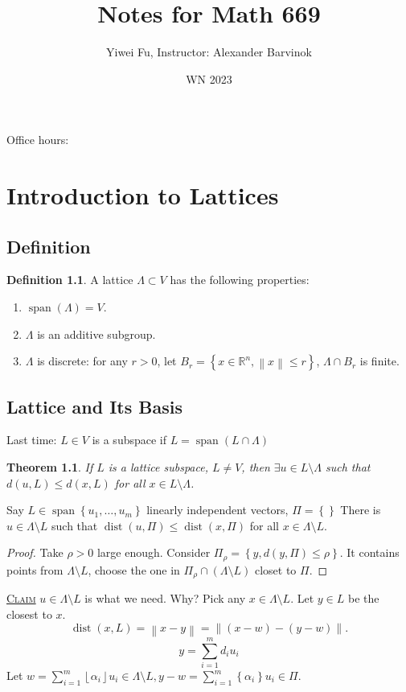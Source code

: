 \documentclass{report}
\newcommand{\R}{\mathbb{R}}
\def \dist {\operatorname{dist}}
\def \dist {\operatorname{dist}}
\newcommand{\norm}[1]{\left\| #1 \right\|}
\newcommand{\floor}[1]{\left\lfloor #1 \right\rfloor}
\newcommand{\set}[1]{\left\{ #1 \right\}}
\newcommand{\fancyem}[1]{\underline{\textsc{#1}}}
\newtheorem{theorem}{Theorem}[section]
\theoremstyle{definition}
\newtheorem{definition}{Definition}[section]
\theoremstyle{remark}
\numberwithin{equation}{section}
\begin{document}
\title{Notes for Math 669}
\author{Yiwei Fu, Instructor: Alexander Barvinok}
\date{WN 2023}
\maketitle


\tableofcontents
Office hours: 

\clearpage
{}


\chapter{Introduction to Lattices}
\section{Definition}
\begin{definition}
    A lattice $\Lambda \subset V$ has the following properties:
    \begin{enumerate}
        \item $\operatorname{span}(\Lambda) = V$.
        \item $\Lambda$ is an additive subgroup.
        \item $\Lambda$ is discrete: for any $r > 0$, let $B_r = \set{x \in \R^n, \norm{x} \leq r}$, $\Lambda \cap B_r$ is finite.
    \end{enumerate}
\end{definition}

\section{Lattice and Its Basis}
Last time: $L \in V$ is a subspace if $L = \operatorname{span} (L \cap \Lambda)$

\begin{theorem}
    If $L$ is a lattice subspace, $L \neq V$, then $\exists u \in L \setminus \Lambda$ such that $d(u, L) \leq d(x, L)$ for all $x \in L \setminus \Lambda$.
\end{theorem}

Say $L \in \operatorname{span}\left\{u_1, \ldots, u_m\right\}$ linearly independent vectors, $\Pi = \left\{\right\}$ There is $u \in \Lambda \setminus L$ such that $\dist(u, \Pi) \leq \dist(x, \Pi)$ for all $x \in \Lambda \setminus L$. 
\begin{proof}
    Take $\rho > 0$ large enough. Consider $\Pi_\rho = \left\{y, d(y, \Pi) \leq \rho\right\}$. It contains points from $\Lambda \setminus L$, choose the one in $\Pi_\rho \cap (\Lambda \setminus L)$ closet to $\Pi$.
\end{proof}
\fancyem{Claim} $u \in \Lambda \setminus L$ is what we need. Why?
Pick any $x \in \Lambda \setminus L$. Let $y \in L$ be the closest to $x$. 
\[\dist(x, L) = \norm{x - y} = \norm{(x - w) - (y - w)}.\]
\[y = \sum_{i=1}^m d_iu_i\]
Let $w = \sum_{i=1}^m \floor{\alpha_i}u_i \in \Lambda \setminus L, y - w = \sum_{i=1}^m \set{\alpha_i}u_i \in \Pi$. 
\end{document}
